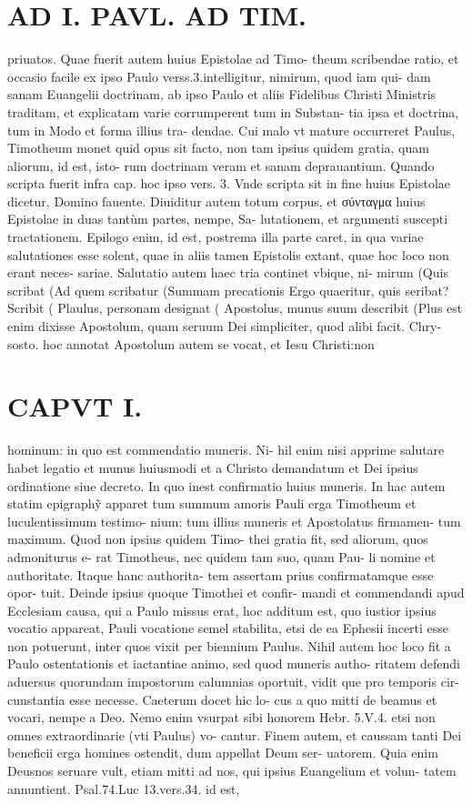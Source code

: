 \documentclass{article}
\begin{document}
\begin{pages}
\section*{AD I. PAVL. AD TIM. }
\marginpar{[ p.2 ]}\pstart priuatos. Quae fuerit autem huius Epistolae ad Timo- theum scribendae ratio, et occasio facile ex ipso Paulo verss.3.intelligitur, nimirum, quod iam qui- dam sanam Euangelii doctrinam, ab ipso Paulo et aliis Fidelibus Christi Ministris traditam, et explicatam varie corrumperent tum in Substan- tia ipsa et doctrina, tum in Modo et forma illius tra- dendae. Cui malo vt mature occurreret Paulus, Timotheum monet quid opus sit facto, non tam ipsius quidem gratia, quam aliorum, id est, isto- rum doctrinam veram et sanam deprauantium. Quando scripta fuerit infra cap. hoc ipso vers. 3. Vnde scripta sit in fine huius Epistolae dicetur, Domino fauente. Diuiditur autem totum corpus, et σύνταγμα huius Epistolae in duas tantùm partes, nempe, Sa- lutationem, et argumenti suscepti tractationem. Epilogo enim, id est, postrema illa parte caret, in qua variae salutationes esse solent, quae in aliis tamen Epistolis extant, quae hoc loco non erant neces- sariae. Salutatio autem haec tria continet vbique, ni- mirum (Quis scribat (Ad quem scribatur (Summam precationis Ergo quaeritur, quis seribat? Scribit ( Plaulus, personam designat ( Apostolus, munus suum describit (Plus est enim dixisse Apostolum, quam seruum Dei simpliciter, quod alibi facit. Chry- sosto. hoc annotat Apostolum autem se vocat, et Iesu Christi:non  \pend
\section*{CAPVT I. }
\marginpar{[ p.3 ]}\pstart hominum: in quo est commendatio muneris. Ni- hil enim nisi apprime salutare habet legatio et munus huiusmodi et a Christo demandatum et Dei ipsius ordinatione siue decreto. In quo inest confirmatio huius muneris. In hac autem statim epigraphỹ apparet tum summum amoris Pauli erga Timotheum et luculentissimum testimo- nium: tum illius muneris et Apostolatus firmamen- tum maximum. Quod non ipsius quidem Timo- thei gratia fit, sed aliorum, quos admoniturus e- rat Timotheus, nec quidem tam suo, quam Pau- li nomine et authoritate. Itaque hanc authorita- tem assertam prius confirmatamque esse opor- tuit. Deinde ipsius quoque Timothei et confir- mandi et commendandi apud Ecclesiam causa, qui a Paulo missus erat, hoc additum est, quo iustior ipsius vocatio appareat, Pauli vocatione semel stabilita, etsi de ea Ephesii incerti esse non potuerunt, inter quos vixit per biennium Paulus. Nihil autem hoc loco fit a Paulo ostentationis et iactantiae animo, sed quod muneris autho- ritatem defendi aduersus quorundam impostorum calumnias oportuit, vidit que pro temporis cir- cunstantia esse necesse. Caeterum docet hic lo- cus a quo mitti de beamus et vocari, nempe a Deo. Nemo enim vsurpat sibi honorem Hebr. 5.V.4. etsi non omnes extraordinarie (vti Paulus) vo- cantur.  \pend\pstart Finem autem, et caussam tanti Dei beneficii erga homines ostendit, dum appellat Deum ser- uatorem. Quia enim Deusnos seruare vult, etiam mitti ad nos, qui ipsius Euangelium et volun- tatem annuntient. Psal.74.Luc 13.vers.34. id est,  \pend

\end{pages}
\end{document}
